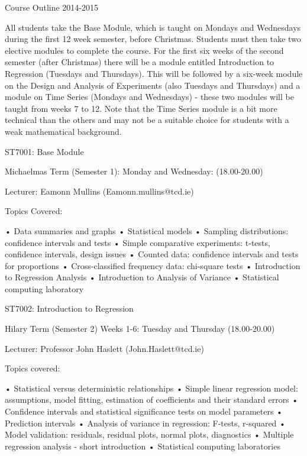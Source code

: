 Course Outline 2014-2015
 
All students take the Base Module, which is taught on Mondays and Wednesdays during the first 12 week semester, before Christmas.  Students must then take two elective modules to complete the course. For the first six weeks of the second semester (after Christmas) there will be a module entitled Introduction to Regression (Tuesdays and Thursdays). This will be followed by a six-week module on the Design and Analysis of Experiments (also Tuesdays and Thursdays) and a module on Time Series (Mondays and Wednesdays) - these two modules will be taught from weeks 7 to 12. Note that the Time Series module is a bit more technical than the others and may not be a suitable choice for students with a weak mathematical background.
 
 
 
ST7001: Base Module 

Michaelmas Term (Semester 1): Monday and Wednesday: (18.00-20.00)
 
Lecturer: Eamonn Mullins (Eamonn.mullins@tcd.ie)
 

Topics Covered: 

• Data summaries and graphs
 • Statistical models
 • Sampling distributions: confidence intervals and tests
 • Simple comparative experiments: t-tests, confidence intervals, design issues
 • Counted data: confidence intervals and tests for proportions
 • Cross-classified frequency data: chi-square tests
 • Introduction to Regression Analysis
 • Introduction to Analysis of Variance
 • Statistical computing laboratory 

 
 
 
 
ST7002: Introduction to Regression 

Hilary Term (Semester 2) Weeks 1-6: Tuesday and Thursday (18.00-20.00)
 
Lecturer: Professor John Haslett (John.Haslett@tcd.ie)
 

  

Topics covered:
 
• Statistical versus deterministic relationships 
• Simple linear regression model: assumptions, model fitting, estimation of coefficients and their standard errors
 • Confidence intervals and statistical significance tests on model parameters
 • Prediction intervals
 • Analysis of variance in regression: F-tests, r-squared
 • Model validation: residuals, residual plots, normal plots, diagnostics
 • Multiple regression analysis - short introduction
 • Statistical computing laboratories 

